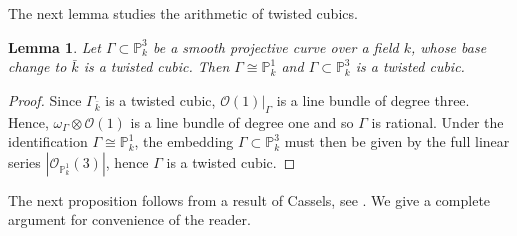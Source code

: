 \documentclass[a4paper,11pt]{amsart}
\numberwithin{equation}{section}
\newtheorem{lemma}[theorem]{Lemma}
\theoremstyle{definition}
\theoremstyle{remark}
\newcommand{\PP}{\mathbb P}
\begin{document}
The next lemma studies the arithmetic of twisted cubics.

\begin{lemma}\label{lem:twisted-cubic}
Let $\Gamma\subset \PP_k^3$ be a smooth projective  curve over a field $k$, whose base change to $\bar k$ is a twisted cubic.
Then $\Gamma\cong \PP^1_k$ and $\Gamma\subset \PP_k^3$ is a twisted cubic.
\end{lemma}
\begin{proof}
Since $\Gamma_{\bar k}$ is a twisted cubic, $\mathcal O(1)|_{\Gamma}$ is a line bundle of degree three.
Hence, $\omega_\Gamma\otimes \mathcal O(1)$ is a line bundle of degree one and so $\Gamma$ is rational.
Under the identification $\Gamma\cong\PP^1_k$, the embedding $\Gamma\subset \PP_k^3$ must then be given by the full linear series $|\mathcal O_{\PP^1_k}(3)|$, hence $\Gamma$ is a twisted cubic.
\end{proof}

The next proposition follows from a result of Cassels, see
\cite[Proposition~3.1, pp.~274--275]{coray}. 
We give a complete argument for convenience of the reader.
\end{document}
